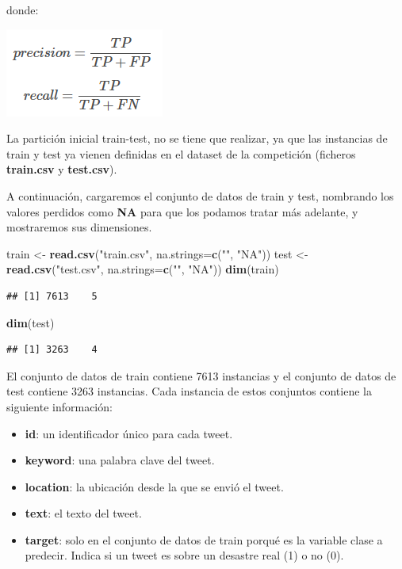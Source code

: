 \documentclass[
]{article}
\newenvironment{Shaded}{\begin{snugshade}}{\end{snugshade}}
\newcommand{\DataTypeTok}[1]{\textcolor[rgb]{0.13,0.29,0.53}{#1}}
\newcommand{\KeywordTok}[1]{\textcolor[rgb]{0.13,0.29,0.53}{\textbf{#1}}}
\newcommand{\NormalTok}[1]{#1}
\newcommand{\StringTok}[1]{\textcolor[rgb]{0.31,0.60,0.02}{#1}}
\providecommand{\tightlist}{%
  \setlength{\itemsep}{0pt}\setlength{\parskip}{0pt}}
\begin{document}
donde:

\begin{center}\includegraphics[width=0.25\linewidth]{F1_score_2} \end{center}

La partición inicial train-test, no se tiene que realizar, ya que las
instancias de train y test ya vienen definidas en el dataset de la
competición (ficheros \textbf{train.csv} y \textbf{test.csv}).

A continuación, cargaremos el conjunto de datos de train y test,
nombrando los valores perdidos como \textbf{NA} para que los podamos
tratar más adelante, y mostraremos sus dimensiones.

\begin{Shaded}
\begin{Highlighting}[]
\NormalTok{train <-}\StringTok{ }\KeywordTok{read.csv}\NormalTok{(}\StringTok{"train.csv"}\NormalTok{, }\DataTypeTok{na.strings=}\KeywordTok{c}\NormalTok{(}\StringTok{""}\NormalTok{, }\StringTok{"NA"}\NormalTok{))}
\NormalTok{test <-}\StringTok{ }\KeywordTok{read.csv}\NormalTok{(}\StringTok{"test.csv"}\NormalTok{, }\DataTypeTok{na.strings=}\KeywordTok{c}\NormalTok{(}\StringTok{""}\NormalTok{, }\StringTok{"NA"}\NormalTok{))}
\KeywordTok{dim}\NormalTok{(train)}
\end{Highlighting}
\end{Shaded}

\begin{verbatim}
## [1] 7613    5
\end{verbatim}

\begin{Shaded}
\begin{Highlighting}[]
\KeywordTok{dim}\NormalTok{(test)}
\end{Highlighting}
\end{Shaded}

\begin{verbatim}
## [1] 3263    4
\end{verbatim}

El conjunto de datos de train contiene 7613 instancias y el conjunto de
datos de test contiene 3263 instancias. Cada instancia de estos
conjuntos contiene la siguiente información:

\begin{itemize}
\tightlist
\item
  \textbf{id}: un identificador único para cada tweet.
\item
  \textbf{keyword}: una palabra clave del tweet.
\item
  \textbf{location}: la ubicación desde la que se envió el tweet.
\item
  \textbf{text}: el texto del tweet.
\item
  \textbf{target}: solo en el conjunto de datos de train porqué es la
  variable clase a predecir. Indica si un tweet es sobre un desastre
  real (1) o no (0).
\end{itemize}
\end{document}
